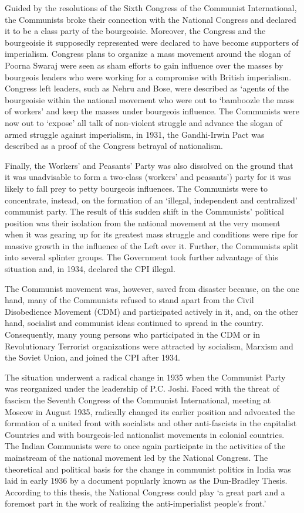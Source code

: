 Guided by the resolutions of the Sixth Congress of the Communist International, the Communists broke their connection with the National Congress and declared it to be a class party of the bourgeoisie. Moreover, the Congress and the bourgeoisie it supposedly represented were declared to have become supporters of imperialism. Congress plans to organize a mass movement around the slogan of Poorna Swaraj were seen as sham efforts to gain influence over the masses by bourgeois leaders who were working for a compromise with British imperialism. Congress left leaders, such as Nehru and Bose, were described as `agents of the bourgeoisie within the national movement who were out to `bamboozle the mass of workers' and keep the masses under bourgeois influence. The Communists were now out to `expose' all talk of non-violent struggle and advance the slogan of armed struggle against imperialism, in 1931, the Gandhi-Irwin Pact was described as a proof of the Congress betrayal of nationalism. 

Finally, the Workers' and Peasants' Party was also dissolved on the ground that it was unadvisable to form a two-class (workers' and peasants') party for it was likely to fall prey to petty bourgeois influences. The Communists were to concentrate, instead, on the formation of an `illegal, independent and centralized' communist party. The result of this sudden shift in the Communists' political position was their isolation from the national movement at the very moment when it was gearing up for its greatest mass struggle and conditions were ripe for massive growth in the influence of the Left over it. Further, the Communists split into several splinter groups. The Government took further advantage of this situation and, in 1934, declared the CPI illegal. 

The Communist movement was, however, saved from disaster because, on the one hand, many of the Communists refused to stand apart from the Civil Disobedience Movement (CDM) and participated actively in it, and, on the other hand, socialist and communist ideas continued to spread in the country. Consequently, many young persons who participated in the CDM or in Revolutionary Terrorist organizations were attracted by socialism, Marxism and the Soviet Union, and joined the CPI after 1934. 

The situation underwent a radical change in 1935 when the Communist Party was reorganized under the leadership of P.C. Joshi. Faced with the threat of fascism the Seventh Congress of the Communist International, meeting at Moscow in August 1935, radically changed its earlier position and advocated the formation of a united front with socialists and other anti-fascists in the capitalist Countries and with bourgeois-led nationalist movements in colonial countries. The Indian Communists were to once again participate in the activities of the mainstream of the national movement led by the National Congress. The theoretical and political basis for the change in communist politics in India was laid in early 1936 by a document popularly known as the Dun-Bradley Thesis. According to this thesis, the National Congress could play `a great part and a foremost part in the work of realizing the anti-imperialist people's front.' 

